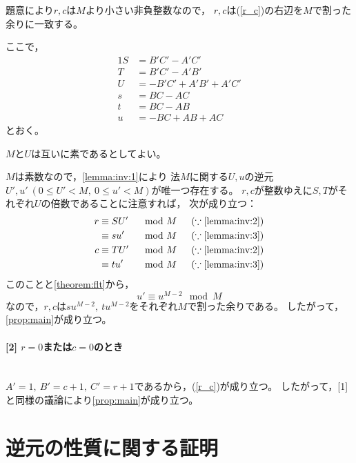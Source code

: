 \documentclass{article}
\makeatletter
\renewenvironment{proof}[1][\proofname]{\par
        \pushQED{\qed}
        \normalfont
        \topsep6\p@\@plus6\p@ \trivlist
        \item[\hskip\labelsep{\bfseries #1}\@addpunct{\bfseries}]\ignorespaces
    }{%
        \popQED\endtrivlist\@endpefalse
    }
\renewcommand{\proofname}{証明.}
\newcommand{\myparagraph}[1]{\paragraph{#1}\mbox{}\\}
\makeatother
\begin{document}
\begin{proof}
    題意により$r, c$は$M$より小さい非負整数なので，
    $r, c$は(\ref{r_c})の右辺を$M$で割った余りに一致する。

    ここで，
    \begin{alignat}{1}
        S &= B'C' - A'C' \\
        T &= B'C' - A'B' \\
        U &= -B'C' + A'B' + A'C' \\
        s &= BC - AC \\
        t &= BC - AB \\
        u &= -BC + AB + AC
    \end{alignat}
    とおく。

    $M$と$U$は互いに素であるとしてよい。 %

    $M$は素数なので，\cref{lemma:inv:1}により
    法$M$に関する$U, u$の逆元$U', u'\ (0 \leq U' < M,\ 0 \leq u' < M)$が唯一つ存在する。
    $r, c$が整数ゆえに$S, T$がそれぞれ$U$の倍数であることに注意すれば，
    次が成り立つ：
    \begin{alignat}{2}
        r &\equiv SU' & &\mod{M} \hspace{15pt} (\because \mbox{\cref{lemma:inv:2}}) \\
          &\equiv su' & &\mod{M} \hspace{15pt} (\because \mbox{\cref{lemma:inv:3}}) \\
        c &\equiv TU' & &\mod{M} \hspace{15pt} (\because \mbox{\cref{lemma:inv:2}}) \\
          &\equiv tu' & &\mod{M} \hspace{15pt} (\because \mbox{\cref{lemma:inv:3}})
    \end{alignat}
    このことと\cref{theorem:flt}から，
    \begin{equation}
        u' \equiv u^{M - 2} \mod{M}
    \end{equation}
    なので，$r, c$は$su^{M - 2},\ tu^{M - 2}$をそれぞれ$M$で割った余りである。
    したがって，\cref{prop:main}が成り立つ。

    \myparagraph{[2] $r = 0$または$c = 0$のとき}

    $A' = 1,\ B' = c + 1,\ C' = r + 1$であるから，(\ref{r_c})が成り立つ。
    したがって，[1]と同様の議論により\cref{prop:main}が成り立つ。
\end{proof}



\section{逆元の性質に関する証明}
\end{document}
